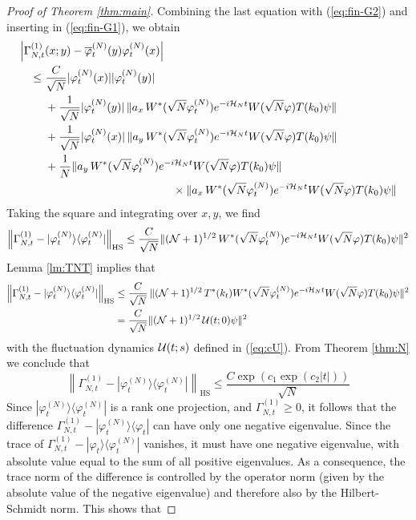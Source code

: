 \documentclass[11pt,a4paper]{article}
\newcommand{\cU}{{\cal U}}
\newcommand{\cH}{{\cal H}}
\newcommand{\cN}{{\cal N}}
\begin{document}
\begin{proof}[Proof of Theorem \ref{thm:main}]
Combining the last equation with (\ref{eq:fin-G2}) and inserting in (\ref{eq:fin-G1}), we obtain
\[ \begin{split} 
\Big| \Gamma^{(1)}_{N,t} &(x;y) - \overline{\varphi}_t^{(N)} (y) \varphi_t^{(N)} (x) \Big| \\ \leq \; & \frac{C}{\sqrt{N}} |\varphi_t^{(N)} (x)| |\varphi_t^{(N)} (y)| \\ &+ \frac{1}{\sqrt{N}} |\varphi^{(N)}_t (y)| \, \| a_x \, W^* (\sqrt{N} \varphi^{(N)}_t)  e^{-i\cH_N t} W(\sqrt{N} \varphi) T(k_0) \psi  \| \\ &+ \frac{1}{\sqrt{N}} |\varphi^{(N)}_t (x)| \, \| a_y \, W^* (\sqrt{N} \varphi^{(N)}_t)  e^{-i\cH_N t} W(\sqrt{N} \varphi) T(k_0) \psi  \| \\ & + \frac{1}{N} 
 \| a_y \, W^* (\sqrt{N} \varphi^{(N)}_t)  e^{-i\cH_N t} W(\sqrt{N} \varphi) T(k_0) \psi  \|   \\ &\hspace{4cm} \times \| a_x \, W^* (\sqrt{N} \varphi^{(N)}_t)  e^{-i\cH_N t} W(\sqrt{N} \varphi) T(k_0) \psi  \| \end{split} \] 
Taking the square and integrating over $x,y$, we find
\[ \left\| \Gamma^{(1)}_{N,t} - |\varphi^{(N)}_t \rangle \langle \varphi_t^{(N)}| \right\|_{\text{HS}} \leq \frac{C}{\sqrt{N}} \| (\cN + 1)^{1/2} \,  W^* (\sqrt{N} \varphi^{(N)}_t) e^{-i\cH_N t} W(\sqrt{N} \varphi) T(k_0) \psi \|^2 \]
Lemma \ref{lm:TNT} implies that
\[ \begin{split} \left\| \Gamma^{(1)}_{N,t} - |\varphi^{(N)}_t \rangle \langle \varphi_t^{(N)}| \right\|_{\text{HS}}  \leq \; &\frac{C}{\sqrt{N}} \,  \| (\cN + 1)^{1/2} \, T^* (k_t) W^* (\sqrt{N} \varphi^{(N)}_t) e^{-i\cH_N t} W(\sqrt{N} \varphi) T(k_0) \psi \|^2 \\ =\; &\frac{C}{\sqrt{N}} \| (\cN + 1)^{1/2} \, \cU (t;0) \psi \|^2  
\end{split}\]
with the fluctuation dynamics $\cU (t;s)$ defined in (\ref{eq:cU}).
{F}rom Theorem \ref{thm:N} we conclude that
\[ \left\| \Gamma^{(1)}_{N,t} - |\varphi^{(N)}_t \rangle \langle \varphi_t^{(N)}| \right\|_{\text{HS}} \leq \frac{C\exp (c_1 \exp (c_2 |t|))}{\sqrt{N}} \]
Since $|\varphi^{(N)}_t\rangle \langle \varphi^{(N)}_t|$ is a rank one projection, and $\Gamma_{N,t}^{(1)} \geq 0$, it follows that the difference $\Gamma_{N,t}^{(1)} - |\varphi^{(N)}_t \rangle \langle \varphi_t|$ can have only  one negative eigenvalue. Since the trace of $\Gamma_{N,t}^{(1)} - |\varphi_t \rangle \langle \varphi^{(N)}_t|$ vanishes, it must have one negative eigenvalue, with absolute value equal to the sum of all positive eigenvalues. As a consequence, the trace norm of the difference is controlled by the operator norm (given by the absolute value of the negative eigenvalue) and therefore also by the Hilbert-Schmidt norm. This shows that

\end{proof}
\end{document}
